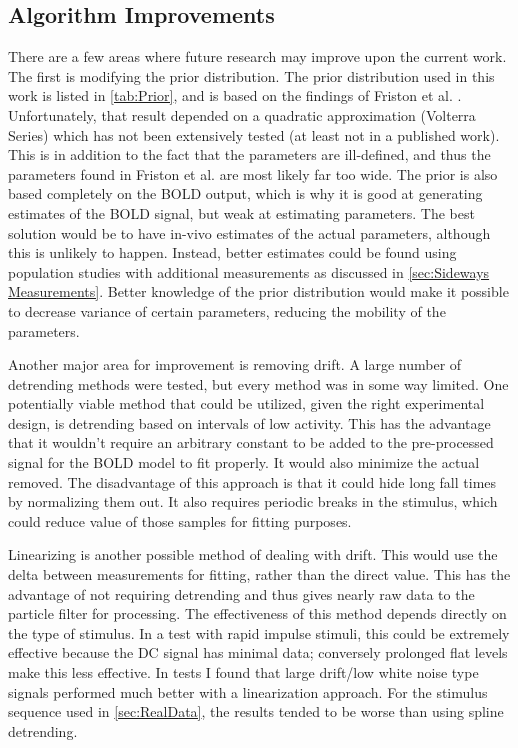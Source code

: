 \subsection{Algorithm Improvements}
\label{sec:Particle Filter Variations}
There are a few areas where future research may improve upon the current
work. The first is modifying the prior
distribution. The prior distribution used in this work is listed in \autoref{tab:Prior},
and is based on the findings of Friston et al. \cite{Friston2000}. Unfortunately, that
result depended on a quadratic approximation (Volterra Series) which has
not been extensively tested (at least not in a published work).
This is in addition to the fact that the parameters are ill-defined, and
thus the parameters found in Friston et al. are most likely far too wide.
The prior is also
based completely on the BOLD output, which is why it is good at generating
estimates of the BOLD signal, but weak at estimating parameters.
The best solution would be to have
in-vivo estimates of the actual parameters, although this
is unlikely to happen. Instead, better estimates could be found
using population studies with additional measurements as discussed in
\autoref{sec:Sideways Measurements}. Better knowledge of the prior distribution
would make it possible to decrease variance of certain
parameters, reducing the mobility of the parameters.

Another major area for improvement is removing drift.
A large number of detrending methods were tested, but every method was in some way limited.
One potentially viable method that could be utilized, given the right
experimental design, is detrending based on intervals of low activity. This
has the advantage that it wouldn't require an arbitrary
constant to be added to the pre-processed signal for the
BOLD model to fit properly. It would also minimize the actual
removed. The disadvantage of this approach is
that it could hide long fall times by normalizing them
out. It also requires periodic breaks in the stimulus,
which could reduce value of those samples for fitting purposes.

Linearizing is another possible method of dealing with drift.
This would use the delta between measurements for fitting, rather than the
direct value. This has the advantage of not requiring detrending and thus
gives nearly raw data to the particle filter for processing.
The effectiveness of this method depends directly on the type of stimulus.
In a test with rapid impulse stimuli, this could be extremely effective because
the DC signal has minimal data; conversely prolonged flat levels make this less effective.
In tests I found that large drift/low white noise
type signals performed much better with a linearization approach.
For the stimulus sequence used in \autoref{sec:RealData}, the results tended to be worse
than using spline detrending.

